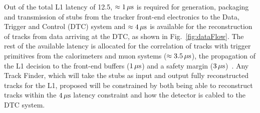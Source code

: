 Out of the total L1 latency of 12.5\mus, $\approx 1\,\mu\text{s}$ is required for generation, packaging and transmission of stubs from the tracker front-end electronics to the Data, Trigger and Control (DTC) system and $\approx 4\,\mu\text{s}$ is available for the reconstruction of tracks from data arriving at the DTC, as shown in Fig.~\ref{fig:dataFlow}.
The rest of the available latency is allocated for the correlation of tracks with trigger primitives from the calorimeters and muon systems ($\approx 3.5\,\mu\text{s}$), the propagation of the L1 decision to the front-end buffers ($1\,\mu\text{s}$) and a safety margin ($3\,\mu\text{s}$)~\cite{CMS_Upgrade_TP}.
Any Track Finder, which will take the stubs as input and output fully reconstructed tracks for the L1, proposed will be constrained by both being able to reconstruct tracks within the $4\,\mu\text{s}$ latency constraint and how the detector is cabled to the DTC system.

